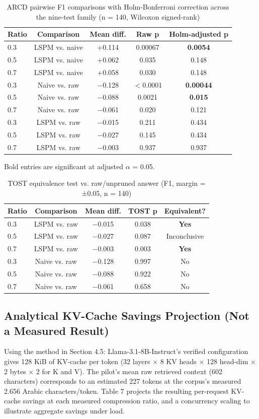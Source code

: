 \begin{table}[htbp]
\caption{ARCD pairwise F1 comparisons with Holm-Bonferroni correction across the nine-test family (n = 140, Wilcoxon signed-rank)}
\label{tab:5}
\centering
\footnotesize
\setlength{\tabcolsep}{3.5pt}
\begin{tabular}{lcccc}
\toprule
Ratio & Comparison & Mean diff. & Raw p & Holm-adjusted p \\
\midrule
0.3 & LSPM vs. naive & +0.114 & 0.00067 & \textbf{0.0054} \\
0.5 & LSPM vs. naive & +0.062 & 0.035 & 0.148 \\
0.7 & LSPM vs. naive & +0.058 & 0.030 & 0.148 \\
0.3 & Naive vs. raw & $-$0.128 & $<$0.0001 & \textbf{0.00044} \\
0.5 & Naive vs. raw & $-$0.088 & 0.0021 & \textbf{0.015} \\
0.7 & Naive vs. raw & $-$0.061 & 0.020 & 0.121 \\
0.3 & LSPM vs. raw & $-$0.015 & 0.211 & 0.434 \\
0.5 & LSPM vs. raw & $-$0.027 & 0.145 & 0.434 \\
0.7 & LSPM vs. raw & $-$0.003 & 0.937 & 0.937 \\
\bottomrule
\end{tabular}
\end{table}
Bold entries are significant at adjusted $\alpha$ = 0.05.

\begin{table}[htbp]
\caption{TOST equivalence test vs. raw/unpruned answer (F1, margin = ±0.05, n = 140)}
\label{tab:6}
\centering
\footnotesize
\setlength{\tabcolsep}{3.5pt}
\begin{tabular}{lcccc}
\toprule
Ratio & Comparison & Mean diff. & TOST p & Equivalent? \\
\midrule
0.3 & LSPM vs. raw & $-$0.015 & 0.038 & \textbf{Yes} \\
0.5 & LSPM vs. raw & $-$0.027 & 0.087 & Inconclusive \\
0.7 & LSPM vs. raw & $-$0.003 & 0.003 & \textbf{Yes} \\
0.3 & Naive vs. raw & $-$0.128 & 0.997 & No \\
0.5 & Naive vs. raw & $-$0.088 & 0.922 & No \\
0.7 & Naive vs. raw & $-$0.061 & 0.658 & No \\
\bottomrule
\end{tabular}
\end{table}
\subsection{Analytical KV-Cache Savings Projection (Not a Measured Result)}
Using the method in Section 4.5: Llama-3.1-8B-Instruct's verified configuration gives 128 KiB of KV-cache per token (32 layers $\times$ 8 KV heads $\times$ 128 head-dim $\times$ 2 bytes $\times$ 2 for K and V). The pilot's mean raw retrieved context (602 characters) corresponds to an estimated 227 tokens at the corpus's measured 2.656 Arabic characters/token. Table 7 projects the resulting per-request KV-cache savings at each measured compression ratio, and a concurrency scaling to illustrate aggregate savings under load.

